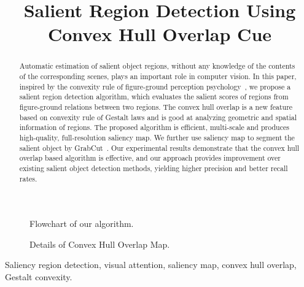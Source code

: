 \documentclass{article}
\begin{document}
\sloppy

\def\x{{\mathbf x}}
\def\L{{\cal L}}


\title{Salient Region Detection Using Convex Hull Overlap Cue}
%
\name{}
\address{}
\maketitle

\begin{figure*}[t]
\begin{minipage}[b]{\linewidth}
	\centering
	\centerline{}
\end{minipage}
\caption{Flowchart of our algorithm.}
\label{fig:flowchart}
\end{figure*}

\begin{figure*}[t]
\begin{minipage}[b]{\linewidth}
	\centering		
	\centerline{}
\end{minipage}
\caption{Details of Convex Hull Overlap Map.}
\label{fig:CHO}
\end{figure*}

\begin{abstract}
Automatic estimation of salient object regions, without any knowledge of the contents of the corresponding scenes, plays an important role in computer vision. In this paper, inspired by the convexity rule of figure-ground perception psychology~\cite{palmer1999vision}\cite{wagemans2012century}, we propose a salient region detection algorithm, which evaluates the salient scores of regions from figure-ground relations between two regions. The convex hull overlap is a new feature based on convexity rule of Gestalt laws and is good at analyzing geometric and spatial information of regions. The proposed algorithm is efficient, multi-scale and produces high-quality, full-resolution saliency map. We further use saliency map to segment the salient object by GrabCut~\cite{rother2004grabcut}. Our experimental results demonstrate that the convex hull overlap based algorithm is effective, and our approach provides improvement over existing salient object detection methods, yielding higher precision and better recall rates.
\end{abstract}
%
\begin{keywords}
Saliency region detection, visual attention, saliency map, convex hull overlap, Gestalt convexity.
\end{keywords}
%
\end{document}
